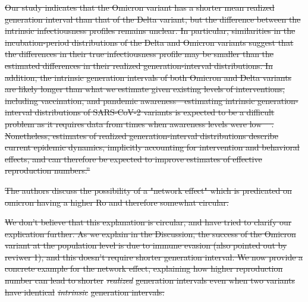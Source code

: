 \documentclass[12pt]{article}
\newcommand{\revtext}{\textsf}
\providecommand{\DIFdeltex}[1]{{\protect\color{red}\sout{#1}}}                      %
\providecommand{\DIFdel}[1]{\texorpdfstring{\DIFdeltex{#1}}{}} %
\begin{document}
\DIFdel{Our study indicates that the Omicron variant has a shorter mean realized generation interval than that of the Delta variant, but the difference between the intrinsic infectiousness profiles remains unclear.
In particular, similarities in the incubation-period distributions of the Delta and Omicron variants suggest that the differences in their true infectiousness profile may be smaller than the estimated differences in their realized generation-interval distributions.
In addition, the intrinsic generation intervals of both Omicron and Delta variants are likely longer than what we estimate given existing levels of interventions, including vaccination, and pandemic awareness---estimating intrinsic generation-interval distributions of SARS-CoV-2 variants is expected to be a difficult problem as it requires data from times when awareness levels were low \mbox{%
\citep{sender2021unmitigated}}\hspace{0pt}%
.
Nonetheless, estimates of realized generation-interval distributions describe current epidemic dynamics, implicitly accounting for intervention and behavioral effects,
and can therefore be expected to improve estimates of effective reproduction numbers.''
}%

\DIFdel{\revtext{The authors discuss the possibility of a "network effect" which is predicated on omicron having a higher Ro and therefore somewhat circular.}
}%

\DIFdel{We don't believe that this explanation is circular, and have tried to clarify our explication further. As we explain in the Discussion, the success of the Omicron variant at the population level is due to immune evasion (also pointed out by reviwer 1), and this doesn't require shorter generation interval. We now provide a concrete example for the network effect, explaining how higher reproduction number can lead to shorter }\emph{\DIFdel{realized}} %
\DIFdel{generation intervals even when two variants have identical }\emph{\DIFdel{intrinsic}} %
\DIFdel{generation intervals:
}%
\end{document}
